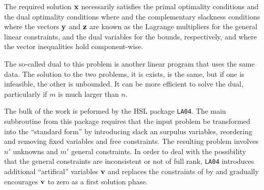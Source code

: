 \documentclass{galahad}
\begin{document}

\galmethod
The required solution ${\mathbf{x}}$ necessarily satisfies
the primal optimality conditions
and
the dual optimality conditions
where
and the complementary slackness conditions
where the vectors ${\mathbf{y}}$ and ${\mathbf{z}}$ are known as the Lagrange multipliers for
the general linear constraints, and the dual variables for the bounds,
respectively, and where the vector inequalities hold component-wise.

The so-called dual to this problem is another linear program
that uses the same data. The solution to the two problems, it is exists,
is the same, but if one is infeasible, the other is unbounded. It can be
more efficient to solve the dual, particularly if $m$ is much larger than $n$.

The bulk of the work is peformed by the HSL package {\tt LA04}. The
main subbroutine from this package requires that the input problem
be transformed into the ``standard form''
by introducing slack an surpulus variables, reordering and
removing fixed variables and free constraints. The resulting
problem involves $n'$ unknowns and $m'$ general constraints.
In order to deal with the possibility that the general constraints
are inconsistent or not of full rank,
{\tt LA04} introduces additional ``artifical'' variables ${\mathbf{v}}$ and replaces
the constraints of  by
and gradually encourages ${\mathbf{v}}$ to zero as a first solution phase.
\end{document}
